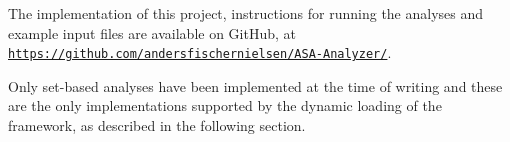 \newpar The implementation of this project, instructions for running the analyses and example input files are available on GitHub, at \href{https://github.com/andersfischernielsen/ASA-Analyzer/}{\texttt{https://github.com/andersfischernielsen/ASA-Analyzer/}}. 

\newpar Only set-based analyses have been implemented at the time of writing and these are the only implementations supported by the dynamic loading of the framework, as described in the following section. 
